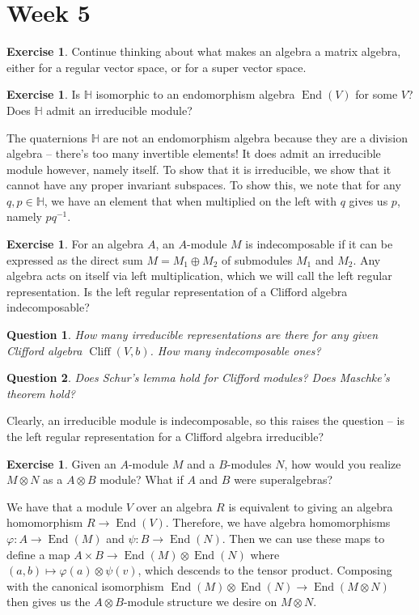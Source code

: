 \documentclass[psamsfonts]{amsart}
\newtheorem*{quest}{Question}
\theoremstyle{definition}
\newtheorem{exer}[thm]{Exercise}
\theoremstyle{remark}
\newcommand{\inv}{^{-1}}
\DeclareMathOperator{\End}{End}
\DeclareMathOperator{\Cliff}{Cliff}
\begin{document}
\section*{Week 5}
%
\begin{exer}
Continue thinking about what makes an algebra a matrix algebra, either for a regular vector space, or for a super vector space.
\end{exer}
%
\begin{exer}
Is $\mathbb{H}$ isomorphic to an endomorphism algebra $\End(V)$ for some $V$? Does $\mathbb{H}$ admit an irreducible module?
\end{exer}
The quaternions $\mathbb{H}$ are not an endomorphism algebra because they are a division algebra -- there's too many invertible elements! It does admit an irreducible module however, namely itself. To show that it is irreducible, we show that it cannot have any proper invariant subspaces. To show this, we note that for any $q,p \in \mathbb{H}$, we have an element that when multiplied on the left with $q$ gives us $p$, namely $pq\inv$.
%
\begin{exer}
For an algebra $A$, an $A$-module $M$ is indecomposable if it can be expressed as the direct sum
$M = M_1 \oplus M_2$ of submodules $M_1$ and $M_2$. Any algebra acts on itself via left multiplication, which we will call the left regular representation. Is the left regular representation of a Clifford algebra indecomposable?
\end{exer}
%
\begin{quest}
How many irreducible representations are there for any given Clifford algebra $\Cliff(V,b)$. How many indecomposable ones?
\end{quest}
%
\begin{quest}
Does Schur's lemma hold for Clifford modules? Does Maschke's theorem hold?
\end{quest}
%
Clearly, an irreducible module is indecomposable, so this raises the question -- is the left regular representation for a Clifford algebra irreducible?
%
\begin{exer}
Given an $A$-module $M$ and a $B$-modules $N$, how would you realize $M \otimes N$ as a $A \otimes B$ module? What if $A$ and $B$ were superalgebras?
\end{exer}
We have that a module $V$ over an algebra $R$ is equivalent to giving an algebra homomorphism $R \to \End(V)$. Therefore, we have algebra homomorphisms $\varphi : A \to \End(M)$ and $\psi : B \to \End(N)$. Then we can use these maps to define a map $A \times B \to \End(M) \otimes \End(N)$ where $(a,b) \mapsto \varphi(a) \otimes \psi(v)$, which descends to the tensor product. Composing with the canonical isomorphism $\End(M) \otimes \End(N) \to \End(M \otimes N)$ then gives us the $A \otimes B$-module structure we desire on $M \otimes N$.
\end{document}
